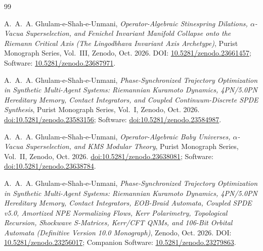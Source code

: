 \documentclass[11pt,a4paper,reqno]{article}
\theoremstyle{plain}
\theoremstyle{definition}
\theoremstyle{remark}
\numberwithin{equation}{section}
\begin{document}
\FloatBarrier
\clearpage

\begin{thebibliography}{99}
\sloppy

A.~A.~A. Ghulam-e-Shah-e-Unmani,
\textit{Operator-Algebraic Stinespring Dilations, $\alpha$-Vacua Superselection, and Fenichel Invariant Manifold Collapse onto the Riemann Critical Axis (The Lingodbhava Invariant Axis Archetype)},
Purist Monograph Series, Vol.~III, Zenodo, Oct. 2026. DOI: \href{https://doi.org/10.5281/zenodo.23661457}{10.5281/zenodo.23661457}; Software: \href{https://doi.org/10.5281/zenodo.23687971}{10.5281/zenodo.23687971}.

\begingroup
\raggedright
A.~A.~A. Ghulam-e-Shah-e-Unmani,
\textit{Phase-Synchronized Trajectory Optimization in Synthetic Multi-Agent Systems: Riemannian Kuramoto Dynamics, 4PN/5.0PN Hereditary Memory, Contact Integrators, and Coupled Continuum-Discrete SPDE Synthesis},
Purist Monograph Series, Vol.~I, Zenodo, Oct. 2026. \href{https://doi.org/10.5281/zenodo.23583156}{doi:10.5281/zenodo.23583156}; Software: \href{https://doi.org/10.5281/zenodo.23584987}{doi:10.5281/zenodo.23584987}.
\par
\endgroup

A.~A.~A. Ghulam-e-Shah-e-Unmani,
\textit{Operator-Algebraic Baby Universes, $\alpha$-Vacua Superselection, and KMS Modular Theory},
Purist Monograph Series, Vol.~II, Zenodo, Oct. 2026. \href{https://doi.org/10.5281/zenodo.23638081}{doi:10.5281/zenodo.23638081}; Software: \href{https://doi.org/10.5281/zenodo.23638784}{doi:10.5281/zenodo.23638784}.

A.~A.~A. Ghulam-e-Shah-e-Unmani,
\textit{Phase-Synchronized Trajectory Optimization in Synthetic Multi-Agent Systems: Riemannian Kuramoto Dynamics, 4PN/5.0PN Hereditary Memory, Contact Integrators, EOB-Braid Automata, Coupled SPDE v5.0, Amortized NPE Normalizing Flows, Kerr Polarimetry, Topological Recursion, Shockwave S-Matrices, Kerr/CFT QNMs, and 106-Bit Orbital Automata (Definitive Version 10.0 Monograph)},
Zenodo, Oct. 2026. DOI: \href{https://doi.org/10.5281/zenodo.23256017}{10.5281/zenodo.23256017}; Companion Software: \href{https://doi.org/10.5281/zenodo.23279863}{10.5281/zenodo.23279863}.


\end{thebibliography}
\end{document}
